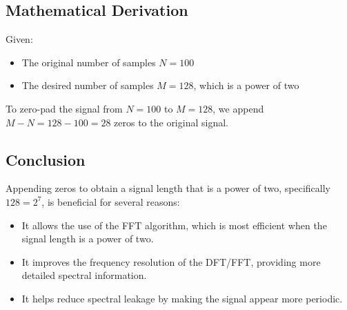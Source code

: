 \subsection*{Mathematical Derivation}
Given:
\begin{itemize}
    \item The original number of samples \( N = 100 \)
    \item The desired number of samples \( M = 128 \), which is a power of two
\end{itemize}

To zero-pad the signal from \( N = 100 \) to \( M = 128 \), we append \( M - N = 128 - 100 = 28 \) zeros to the original signal.

\subsection*{Conclusion}
Appending zeros to obtain a signal length that is a power of two, specifically \( 128 = 2^7 \), is beneficial for several reasons:
\begin{itemize}
    \item It allows the use of the FFT algorithm, which is most efficient when the signal length is a power of two.
    \item It improves the frequency resolution of the DFT/FFT, providing more detailed spectral information.
    \item It helps reduce spectral leakage by making the signal appear more periodic.
\end{itemize}
